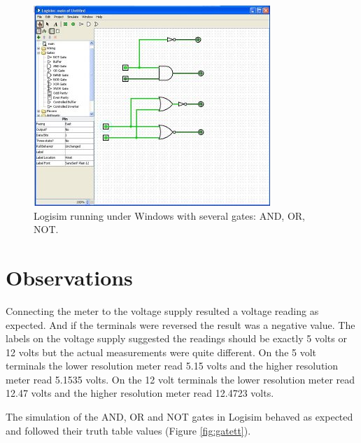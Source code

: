 \documentclass[12pt]{article}
\begin{document}
\begin{figure}[!hbtp]
\center
\includegraphics[scale=1.0]{logisim-02}
\caption{Logisim running under Windows with several gates: AND, OR, NOT.}
\label{fig:logisim}
\end{figure}

\clearpage %

\section{Observations}

Connecting the meter to the voltage supply resulted a voltage reading
as expected.
And if the terminals were reversed the result was a negative value.
The labels on the voltage supply suggested the readings should be
exactly 5 volts or 12 volts but the actual measurements were quite different.
On the 5 volt terminals the lower resolution meter read 5.15 volts and
the higher resolution meter read 5.1535 volts.
On the 12 volt terminals the lower resolution meter read 12.47 volts and
the higher resolution meter read 12.4723 volts.

The simulation of the AND, OR and NOT gates in Logisim behaved as expected
and followed their truth table values (Figure \ref{fig:gatett}).
\end{document}
